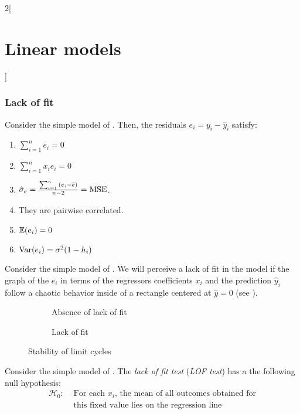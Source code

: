 \documentclass[../../../main_math.tex]{subfiles}
\begin{document}
\begin{multicols}{2}[\section{Linear models}]
  \subsubsection{Lack of fit}
  \begin{definition}
    Consider the simple model of . Then, the residuals $e_i=y_i-\hat{y}_i$ satisfy:
    \begin{enumerate}
      \item $\sum_{i=1}^ne_i=0$
      \item $\sum_{i=1}^nx_ie_i=0$
      \item $\hat\sigma_e=\frac{\sum_{i=1}^n{(e_i-\overline{e})}}{n-2}=\operatorname{MSE}$.
      \item They are pairwise correlated.
      \item $\mathbb{E}(e_i)= 0$
      \item $\mathrm{Var}(e_i)=\sigma^2(1-h_{i})$
    \end{enumerate}
  \end{definition}
  \begin{proposition}
    Consider the simple model of . We will perceive a lack of fit in the model if the graph of the $e_i$ in terms of the regressors coefficients $x_i$ and the prediction $\hat{y}_i$ follow a chaotic behavior inside of a rectangle centered at $\hat{y}=0$ (see ).
  \end{proposition}
  \begin{figure}[H]
    \centering
    \begin{subfigure}[b]{0.48\linewidth}
      \centering
      
      \caption{Absence of lack of fit}
    \end{subfigure}
    \hfill
    \begin{subfigure}[b]{0.48\linewidth}
      \centering
      
      \caption{Lack of fit}
    \end{subfigure}
    \caption{Stability of limit cycles}
    \label{LM:lackoffit}
  \end{figure}
  \begin{proposition}
    Consider the simple model of . The \emph{lack of fit test} (\emph{LOF test}) has a the following null hypothesis:
    \begin{align*}
      \mathcal{H}_0: & \text{ For each $x_i$, the mean of all outcomes obtained for} \\
                     & \text{ this fixed value lies on the regression line}

\end{align*}
\end{proposition}
\end{multicols}
\end{document}
